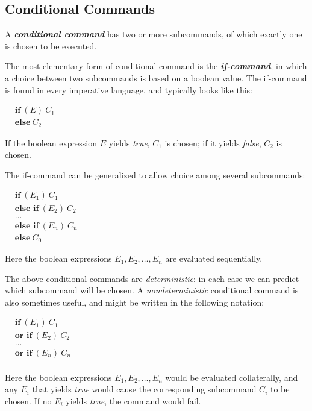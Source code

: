 \subsection{Conditional Commands}
\label{sec:conditional-com}

A \textit{\textbf{conditional command}} has two or more subcommands, of which exactly one is chosen to be executed.

The most elementary form of conditional command is the \textit{\textbf{if-command}}, in which a choice between two subcommands is based on a boolean value. The if-command is found in every imperative language, and typically looks like this:

$\begin{aligned}
  &\textbf{if}\ (E)\ C_1\\
  &\textbf{else}\ C_2
\end{aligned}$

\noindent If the boolean expression $E$ yields \textit{true}, $C_1$ is chosen; if it yields \textit{false}, $C_2$ is chosen.

The if-command can be generalized to allow choice among several subcommands:

$\begin{aligned}
  &\textbf{if}\ (E_1)\ C_1\\
  &\textbf{else if}\ (E_2)\ C_2\\
  &...\\
  &\textbf{else if}\ (E_n)\ C_n\\
  &\textbf{else}\ C_0
\end{aligned}$

\noindent Here the boolean expressions $E_1, E_2, \ldots, E_n$ are evaluated sequentially.

\newpage

The above conditional commands are \textit{deterministic}: in each case we can predict which subcommand will be chosen. A \textit{nondeterministic} conditional command is also sometimes useful, and might be written in the following notation:

$\begin{aligned}
  &\textbf{if}\ (E_1)\ C_1\\
  &\textbf{or if}\ (E_2)\ C_2\\
  &...\\
  &\textbf{or if}\ (E_n)\ C_n\\
\end{aligned}$

\noindent Here the boolean expressions $E_1, E_2, \ldots, E_n$ would be evaluated collaterally, and any $E_i$ that yields \textit{true} would cause the corresponding subcommand $C_i$ to be chosen. If no $E_i$ yields \textit{true}, the command would fail.

